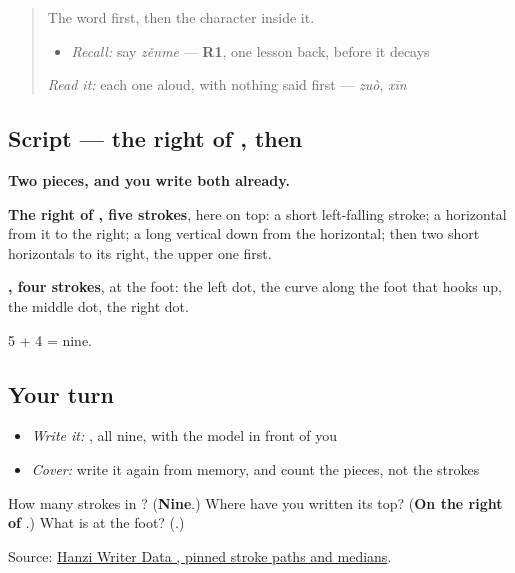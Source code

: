 \label{lesson:ZH-W283-zen}



\begin{quote}
The word first, then the character inside it.

\begin{itemize}
\raggedright
  \item \emph{Recall:} say \emph{zěnme} — \textbf{R1}, one lesson back, before it decays
\end{itemize}

\begin{quote}
 
\end{quote}

\emph{Read it:} each one aloud, with nothing said first — \emph{zuò}, \emph{xīn}
\end{quote}

\subsection*{Script — the right of , then }

\begin{quote}
\end{quote}

\textbf{Two pieces, and you write both already.}

\textbf{The right of , five strokes}, here on top: a short left-falling stroke; a horizontal from it to the right; a long vertical down from the horizontal; then two short horizontals to its right, the upper one first.

\textbf{, four strokes}, at the foot: the left dot, the curve along the foot that hooks up, the middle dot, the right dot.

5 + 4 = nine.

\subsection*{Your turn}
\begin{itemize}
\raggedright
  \item \emph{Write it:} , all nine, with the model in front of you
  \item \emph{Cover:} write it again from memory, and count the pieces, not the strokes
\end{itemize}

\begin{tcolorbox}[breakable,colback=teal!4,colframe=teal!35!black,title={Before you move on}]
How many strokes in ? (\textbf{Nine}.) Where have you written its top? (\textbf{On the right of }.) What is at the foot? (\textbf{}.)

Source: \href{https://raw.githubusercontent.com/chanind/hanzi-writer-data/68d10a4b21150cae5e1ebbd223eed289cf32d90c/data/\%E6\%80\%8E.json}{Hanzi Writer Data , pinned stroke paths and medians}.
\end{tcolorbox}
